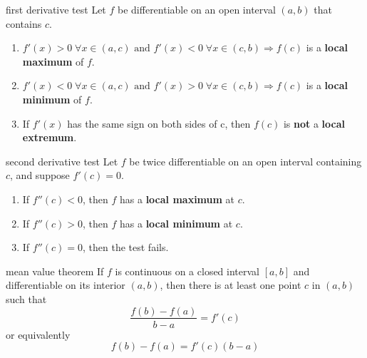 \documentclass[avery5371,grid]{flashcards}
\begin{document}
\begin{flashcard}[Theorem]{first derivative test}
Let $f$ be differentiable on an open interval $(a,b)$ that contains $c$.
\begin{enumerate}
\item $f'(x)>0 \;\forall x \in (a,c) \text{ and } f'(x)<0 \;\forall x \in (c,b)
\Rightarrow f(c)$ is a \textbf{local maximum} of $f$.
\item $f'(x)<0 \;\forall x \in (a,c) \text{ and } f'(x)>0 \;\forall x \in (c,b)
\Rightarrow f(c)$ is a \textbf{local minimum} of $f$.
\item If $f'(x)$ has the same sign on both sides of c, then $f(c)$ is \textbf{not} a
\textbf{local extremum}.
\end{enumerate}
\end{flashcard}

\begin{flashcard}[Theorem]{second derivative test}
Let $f$ be twice differentiable on an open interval containing $c$,
and suppose $f'(c)=0$.
\begin{enumerate}
\item If $f''(c)<0$, then $f$ has a \textbf{local maximum} at $c$.
\item If $f''(c)>0$, then $f$ has a \textbf{local minimum} at $c$.
\item If $f''(c)=0$, then the test fails.
\end{enumerate}
\end{flashcard}

\begin{flashcard}[Theorem]{mean value theorem}
If $f$ is continuous on a closed interval $[a,b]$ and differentiable
on its interior $(a,b)$, then there is at least one point $c$ in
$(a,b)$ such that
\begin{equation*}
\dfrac{f(b)-f(a)}{b-a}=f'(c)
\end{equation*}
or equivalently
\begin{equation*}
f(b)-f(a)=f'(c)(b-a)
\end{equation*}
\end{flashcard}
\end{document}

